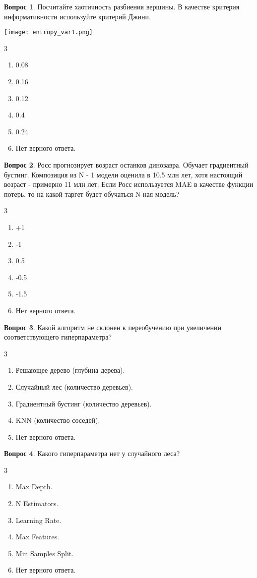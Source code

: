 \documentclass[12pt]{article}
\newenvironment{answerlist}[1][3]{
\begin{multicols}{#1}

\begin{enumerate}[label=\fbox{\emph{\Alph*}},ref=\emph{\alph*}]
}
{
\item Нет верного ответа.
\end{enumerate}
\end{multicols}
}
\theoremstyle{definition}
\newtheorem{question}{Вопрос}
\begin{document}
\newpage

\begin{question}
Посчитайте хаотичность разбиения вершины. В качестве критерия информативности используйте критерий Джини.
    \begin{center}
        \texttt{[image: entropy\_var1.png]}
    \end{center}
\begin{answerlist}
  \item 0.08
  \item 0.16
  \item 0.12
  \item 0.4
  \item 0.24
\end{answerlist}
\end{question}



\begin{question}
Росс прогнозирует возраст останков динозавра. Обучает градиентный бустинг. Композиция из N - 1 модели оценила в 10.5 млн лет, хотя настоящий возраст - примерно 11 млн лет. Если Росс используется MAE в качестве функции потерь, то на какой таргет будет обучаться N-ная модель?
\begin{answerlist}
  \item +1
  \item -1
  \item 0.5
  \item -0.5
  \item -1.5
\end{answerlist}
\end{question}

\begin{question}
Какой алгоритм не склонен к переобучению при увеличении соответствующего гиперпараметра?
\begin{answerlist}
  \item Решающее дерево (глубина дерева).
  \item Случайный лес (количество деревьев).
  \item Градиентный бустинг (количество деревьев).
  \item KNN (количество соседей).
\end{answerlist}
\end{question}

\begin{question}
Какого гиперпараметра нет у случайного леса?
\begin{answerlist}
  \item Max Depth.
  \item N Estimators.
  \item Learning Rate.
  \item Max Features.
  \item Min Samples Split.
\end{answerlist}
\end{question}
\end{document}
